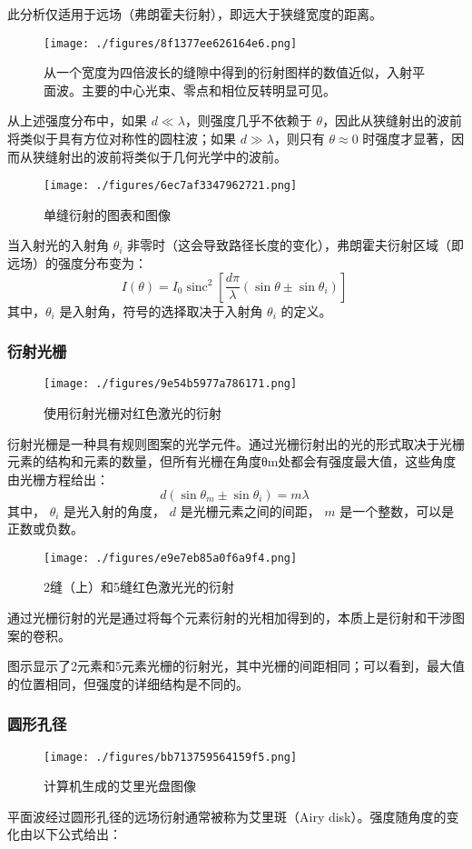 此分析仅适用于远场（弗朗霍夫衍射），即远大于狭缝宽度的距离。
\begin{figure}[ht]
\centering
\texttt{[image: ./figures/8f1377ee626164e6.png]}
\caption{从一个宽度为四倍波长的缝隙中得到的衍射图样的数值近似，入射平面波。主要的中心光束、零点和相位反转明显可见。} \label{fig_YS_16}
\end{figure}
从上述强度分布中，如果 \( d \ll \lambda \)，则强度几乎不依赖于 \( \theta \)，因此从狭缝射出的波前将类似于具有方位对称性的圆柱波；如果 \( d \gg \lambda \)，则只有 \( \theta \approx 0 \) 时强度才显著，因而从狭缝射出的波前将类似于几何光学中的波前。
\begin{figure}[ht]
\centering
\texttt{[image: ./figures/6ec7af3347962721.png]}
\caption{单缝衍射的图表和图像} \label{fig_YS_17}
\end{figure}
当入射光的入射角 \( \theta_i \) 非零时（这会导致路径长度的变化），弗朗霍夫衍射区域（即远场）的强度分布变为：
\[
I(\theta) = I_0 \operatorname{sinc}^2 \left[ \frac{d\pi}{\lambda} (\sin \theta \pm \sin \theta_i) \right]~
\]
其中，\( \theta_i \) 是入射角，符号的选择取决于入射角 \( \theta_i \) 的定义。
\subsubsection{衍射光栅}  
\begin{figure}[ht]
\centering
\texttt{[image: ./figures/9e54b5977a786171.png]}
\caption{使用衍射光栅对红色激光的衍射} \label{fig_YS_18}
\end{figure} 
衍射光栅是一种具有规则图案的光学元件。通过光栅衍射出的光的形式取决于光栅元素的结构和元素的数量，但所有光栅在角度θm处都会有强度最大值，这些角度由光栅方程给出：  
\[
d\left(\sin {\theta _{m}}\pm \sin {\theta _{i}}\right)=m\lambda~
\]  
其中，  
\(\theta _{i}\) 是光入射的角度，  
\(d\) 是光栅元素之间的间距，  
\(m\) 是一个整数，可以是正数或负数。  
\begin{figure}[ht]
\centering
\texttt{[image: ./figures/e9e7eb85a0f6a9f4.png]}
\caption{2缝（上）和5缝红色激光光的衍射} \label{fig_YS_19}
\end{figure}
通过光栅衍射的光是通过将每个元素衍射的光相加得到的，本质上是衍射和干涉图案的卷积。  

图示显示了2元素和5元素光栅的衍射光，其中光栅的间距相同；可以看到，最大值的位置相同，但强度的详细结构是不同的。
\subsubsection{圆形孔径}
\begin{figure}[ht]
\centering
\texttt{[image: ./figures/bb713759564159f5.png]}
\caption{计算机生成的艾里光盘图像} \label{fig_YS_20}
\end{figure}
平面波经过圆形孔径的远场衍射通常被称为艾里斑（Airy disk）。强度随角度的变化由以下公式给出：

